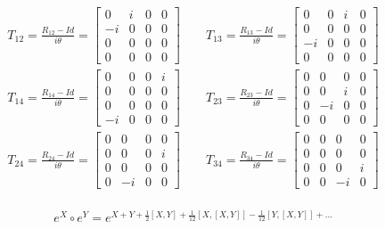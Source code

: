 \documentclass{tstextbook}
\begin{document}
\begin{example}
$$\begin{gather}T_{12}= \frac{R_{12} - Id}{i\theta } = \left[\begin{matrix}0 & i & 0 & 0\\- i & 0 & 0 & 0\\0 & 0 & 0 & 0\\0 & 0 & 0 & 0\end{matrix}\right] \qquad T_{13}= \frac{R_{13} - Id}{i\theta } = \left[\begin{matrix}0 & 0 & i & 0\\0 & 0 & 0 & 0\\- i & 0 & 0 & 0\\0 & 0 & 0 & 0\end{matrix}\right]\\T_{14}= \frac{R_{14} - Id}{i\theta } = \left[\begin{matrix}0 & 0 & 0 & i\\0 & 0 & 0 & 0\\0 & 0 & 0 & 0\\- i & 0 & 0 & 0\end{matrix}\right] \qquad T_{23}= \frac{R_{23} - Id}{i\theta } = \left[\begin{matrix}0 & 0 & 0 & 0\\0 & 0 & i & 0\\0 & - i & 0 & 0\\0 & 0 & 0 & 0\end{matrix}\right]\\T_{24}= \frac{R_{24} - Id}{i\theta} = \left[\begin{matrix}0 & 0 & 0 & 0\\0 & 0 & 0 & i\\0 & 0 & 0 & 0\\0 & - i & 0 & 0\end{matrix}\right]\qquad T_{34}= \frac{R_{34} - Id}{i\theta} = \left[\begin{matrix}0 & 0 & 0 & 0\\0 & 0 & 0 & 0\\0 & 0 & 0 & i\\0 & 0 & - i & 0\end{matrix}\right]\\
\end{gather}$$

\end{example}
\begin{proposition}
$$e^{X}\circ e^ {Y}=e^{X+Y+{\frac{1}{2}}[X,Y]+{\frac{1}{12}}[X,[X,Y]]-{\frac{1}{12}}[Y,[X,Y]]+\ldots}$$

\end{proposition}
\end{document}
